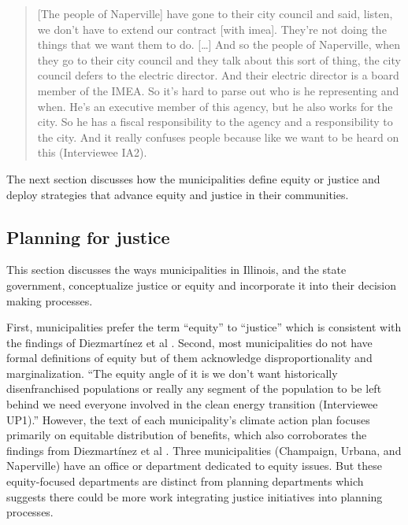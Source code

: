\begin{quote}
    [The people of Naperville] have gone to their city council and said, listen,
    we don't have to extend our contract [with \ac{imea}]. They're not doing the
    things that we want them to do. [\dots] And so the people of Naperville,
    when they go to their city council and they talk about this sort of thing,
    the city council defers to the electric director. And their electric
    director is a board member of the IMEA. So it's hard to parse out who is he
    representing and when. He's an executive member of this agency, but he also
    works for the city. So he has a fiscal responsibility to the agency and a
    responsibility to the city. And it really confuses people because like we
    want to be heard on this (Interviewee IA2).
\end{quote}

The next section discusses how the municipalities define equity or justice and
deploy strategies that advance equity and justice in their communities.

\subsection{Planning for justice}
\label{section:muni-justice}

This section discusses the ways municipalities in Illinois, and the state
government, conceptualize justice or equity and incorporate it into their
decision making processes.

First, municipalities prefer the term ``equity'' to ``justice'' which is
consistent with the findings of Diezmart\'inez et al
\cite{diezmartinez_us_2022}. Second, most municipalities do not have formal
definitions of equity but of them acknowledge disproportionality and
marginalization. ``The equity angle of it is we don't want historically
disenfranchised populations or really any segment of the population to be left
behind we need everyone involved in the clean energy transition (Interviewee
UP1).'' However, the text of each municipality's climate action plan focuses
primarily on equitable distribution of benefits, which also corroborates the
findings from Diezmart\'inez et al \cite{diezmartinez_us_2022}. Three
municipalities (Champaign, Urbana, and Naperville) have an office or department
dedicated to equity issues. But these equity-focused departments are distinct
from planning departments which suggests there could be more work integrating
justice initiatives into planning processes.

